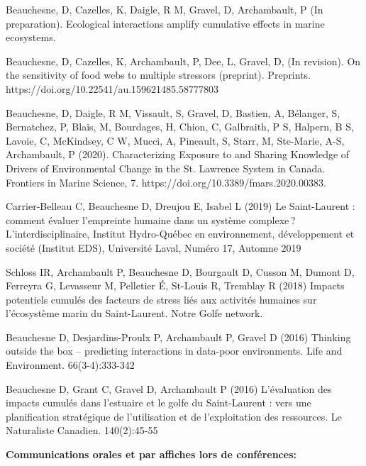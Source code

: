 \begin{singlespace}

Beauchesne, D, Cazelles, K, Daigle, R M, Gravel, D, Archambault, P (In preparation). Ecological interactions amplify cumulative effects in marine ecosystems.

Beauchesne, D, Cazelles, K, Archambault, P, Dee, L, Gravel, D, (In revision). On the sensitivity of food webs to multiple stressors (preprint). Preprints. https://doi.org/10.22541/au.159621485.58777803

Beauchesne, D, Daigle, R M, Vissault, S, Gravel, D, Bastien, A, Bélanger, S, Bernatchez, P, Blais, M, Bourdages, H, Chion, C, Galbraith, P S, Halpern, B S, Lavoie, C, McKindsey, C W, Mucci, A, Pineault, S, Starr, M, Ste-Marie, A-S, Archambault, P (2020). Characterizing Exposure to and Sharing Knowledge of Drivers of Environmental Change in the St. Lawrence System in Canada. Frontiers in Marine Science, 7. https://doi.org/10.3389/fmars.2020.00383.

Carrier-Belleau C, Beauchesne D, Dreujou E, Isabel L (2019) Le Saint-Laurent : comment évaluer l’empreinte humaine dans un système complexe ? L'interdisciplinaire, Institut Hydro-Québec en environnement, développement et société (Institut EDS), Université Laval, Numéro 17, Automne 2019

Schloss IR, Archambault P, Beauchesne D, Bourgault D, Cusson M, Dumont D, Ferreyra G, Levasseur M, Pelletier É, St-Louis R, Tremblay R (2018) Impacts potentiels cumulés des facteurs de stress liés aux activités humaines sur l’écosystème marin du Saint-Laurent. Notre Golfe network.

Beauchesne D, Desjardins-Proulx P, Archambault P, Gravel D (2016) Thinking outside the box – predicting interactions in data-poor environments. Life and Environment. 66(3-4):333-342

Beauchesne D, Grant C, Gravel D, Archambault P (2016) L’évaluation des impacts cumulés dans l’estuaire et le golfe du Saint-Laurent : vers une planification stratégique de l’utilisation et de l’exploitation des ressources. Le Naturaliste Canadien. 140(2):45-55

\end{singlespace}

\textbf{Communications orales et par affiches lors de conférences:}

